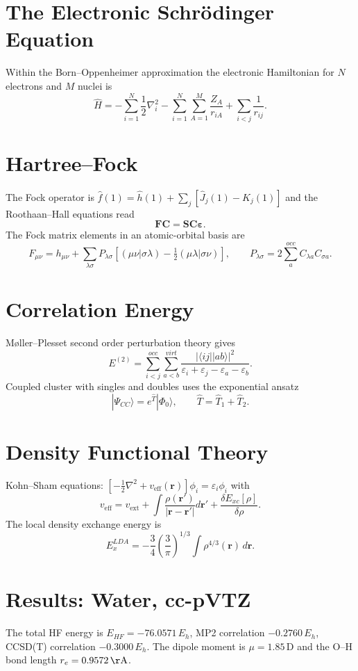\documentclass{article}
\begin{document}
\section{The Electronic Schr\"odinger Equation}

Within the Born--Oppenheimer approximation the electronic Hamiltonian for $N$ electrons and $M$ nuclei is
\[ \hat H = -\sum_{i=1}^{N}\frac{1}{2}\nabla_i^2 - \sum_{i=1}^{N}\sum_{A=1}^{M}\frac{Z_A}{r_{iA}} + \sum_{i<j}\frac{1}{r_{ij}}. \]

\section{Hartree--Fock}
The Fock operator is $\hat f(1)=\hat h(1)+\sum_{j}\left[\hat J_j(1)-\hat K_j(1)\right]$ and the Roothaan--Hall equations read
\[ \mathbf{F}\mathbf{C}=\mathbf{S}\mathbf{C}\boldsymbol{\varepsilon}. \]
The Fock matrix elements in an atomic-orbital basis are
\[ F_{\mu\nu}=h_{\mu\nu}+\sum_{\lambda\sigma}P_{\lambda\sigma}\left[(\mu\nu|\sigma\lambda)-\tfrac{1}{2}(\mu\lambda|\sigma\nu)\right],\qquad P_{\lambda\sigma}=2\sum_{a}^{occ}C_{\lambda a}C_{\sigma a}. \]

\section{Correlation Energy}
M{\o}ller--Plesset second order perturbation theory gives
\[ E^{(2)}=\sum_{i<j}^{occ}\sum_{a<b}^{virt}\frac{|\langle ij||ab\rangle|^2}{\varepsilon_i+\varepsilon_j-\varepsilon_a-\varepsilon_b}. \]
Coupled cluster with singles and doubles uses the exponential ansatz
\[ |\Psi_{CC}\rangle=e^{\hat T}|\Phi_0\rangle,\qquad \hat T=\hat T_1+\hat T_2. \]

\section{Density Functional Theory}
Kohn--Sham equations: $\left[-\tfrac12\nabla^2+v_{\mathrm{eff}}(\mathbf r)\right]\phi_i=\varepsilon_i\phi_i$ with
\[ v_{\mathrm{eff}}=v_{\mathrm{ext}}+\int\frac{\rho(\mathbf r')}{|\mathbf r-\mathbf r'|}d\mathbf r'+\frac{\delta E_{xc}[\rho]}{\delta\rho}. \]
The local density exchange energy is
\[ E_x^{LDA}=-\frac{3}{4}\left(\frac{3}{\pi}\right)^{1/3}\int\rho^{4/3}(\mathbf r)\,d\mathbf r. \]

\section{Results: Water, cc-pVTZ}
The total HF energy is $E_{HF}=-76.0571\,E_h$, MP2 correlation $-0.2760\,E_h$, CCSD(T) correlation $-0.3000\,E_h$.
The dipole moment is $\mu=1.85\,\mathrm{D}$ and the O--H bond length $r_e=0.9572\,\mathrm{\AA}$.
\end{document}
